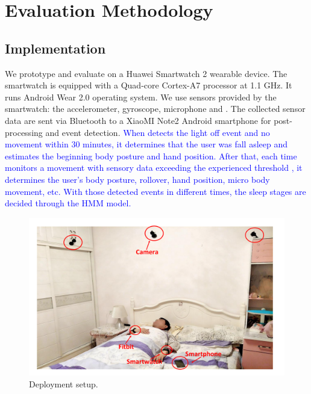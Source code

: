 \section{Evaluation Methodology}
\subsection{Implementation}
We prototype and evaluate \systemname on a Huawei Smartwatch 2 wearable device. The smartwatch is equipped with a Quad-core Cortex-A7 processor at 1.1 GHz.  It runs Android Wear 2.0 operating system. We use  sensors provided by the smartwatch: the
accelerometer, gyroscope, microphone and . The collected sensor data are sent via Bluetooth to a XiaoMI Note2 Android smartphone for post-processing and event detection. 
\textcolor{blue}{When \systemname detects the light off event and no movement within 30 minutes, it determines that the user was fall asleep and estimates the beginning body posture and hand position. After that, each time \systemname monitors a movement with sensory data exceeding the experienced threshold , it  determines the user's body posture, rollover, hand position, micro body movement, etc. With those detected events in different times, the sleep stages are decided through the HMM model.}


\begin{figure}[!thbp]
	\centering
	\includegraphics[width=0.52\linewidth]{Figures/setup.pdf}
	\caption{Deployment setup.}\label{fig:setup}
\end{figure}



